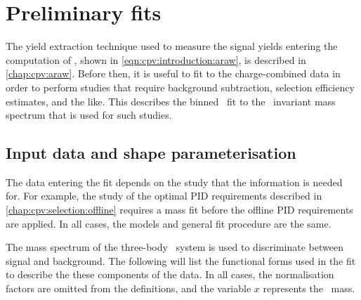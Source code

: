 \chapter{Preliminary fits}
\label{chap:cpv:prelim_fits}

The yield extraction technique used to measure the signal yields entering the
computation of \ARaw, shown in \cref{eqn:cpv:introduction:araw}, is described
in \cref{chap:cpv:araw}.
Before then, it is useful to fit to the charge-combined data in order to
perform studies that require background subtraction, selection efficiency
estimates, and the like.
This  describes the binned \chisq\ fit to the
\phh\ invariant mass spectrum that is used for such studies.

\section{Input data and shape parameterisation}
\label{chap:cpv:prelim_fits:data_pdfs}

The data entering the fit depends on the study that the information is needed
for.
For example, the study of the optimal \ac{PID} requirements described in
\cref{chap:cpv:selection:offline} requires a mass fit before the offline
\ac{PID} requirements are applied.
In all cases, the models and general fit procedure are the same.

The mass spectrum of the three-body \phh\ system is used to discriminate
between signal and background.
The following will list the functional forms used in the fit to describe the
these components of the data.
In all cases, the normalisation factors are omitted from the definitions, and
the variable $x$ represents the \PLambdac\ mass.


